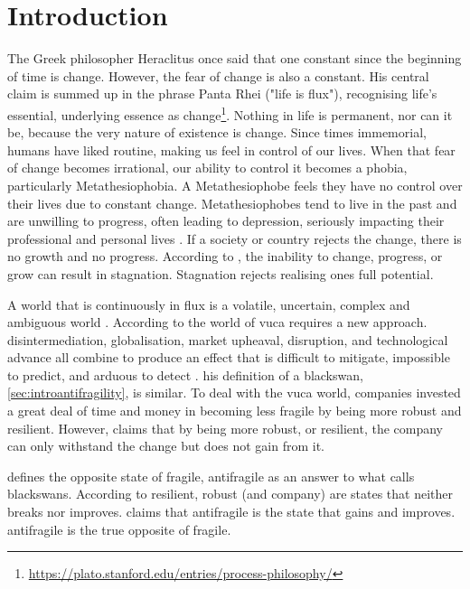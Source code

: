 \chapter{Introduction}
\label{ch:introduction}
The Greek philosopher Heraclitus once said that one constant since the beginning of time is change. However, the fear of change is also a constant.  His central claim is summed up in the phrase Panta Rhei ("life is flux"), recognising life's essential, underlying essence as change\footnote[1]{\url{https://plato.stanford.edu/entries/process-philosophy/}}. Nothing in life is permanent, nor can it be, because the very nature of existence is change. Since times \gls{immemorial}, humans have liked routine, making us feel in control of our lives. When that fear of change becomes irrational, our ability to control it becomes a phobia, particularly Metathesiophobia. A Metathesiophobe feels they have no control over their lives due to constant change. Metathesiophobes tend to live in the past and are unwilling to progress, often leading to depression, seriously impacting their professional and personal lives \parencite{PsychTimes}. If a society or country rejects the change, there is no growth and no progress. According to \textcite{Mark2010}, the inability to change, progress, or grow can result in stagnation. Stagnation rejects realising ones full potential.

A world that is continuously in flux is a volatile, uncertain, complex and ambiguous world \parencites{Bennett2014}{Sinha2020}. According to \textcite{Bennett2014} the world of \acrfull{vuca} requires a new approach. \Gls{disintermediation}, globalisation, market upheaval, disruption, and technological advance all combine to produce an effect that is difficult to mitigate,  impossible to predict, and \gls{arduous} to detect \parencite[p.~885]{OReilly2019}. \textcite{Taleb2008} his definition of a \gls{blackswan}, \cref{sec:introantifragility}, is similar. To deal with the \acrshort{vuca} world, companies invested a great deal of time and money in becoming less \gls{fragile} by being more \gls{robust} and \gls{resilient}. However, \textcite{Taleb2012} claims that by being more \gls{robust}, or \gls{resilient}, the company can only withstand the change but does not gain from it.

\textcite{Taleb2012} defines the opposite state of \gls{fragile}, \gls{antifragile} as an answer to what \textcite{Taleb2008} calls \glspl{blackswan}. According to \textcite{Taleb2012} \gls{resilient}, \gls{robust} (and company) are states that neither breaks nor improves. \textcite{Taleb2012} claims that \gls{antifragile} is the state that gains and improves. \Gls{antifragile} is the true opposite of \gls{fragile}.

